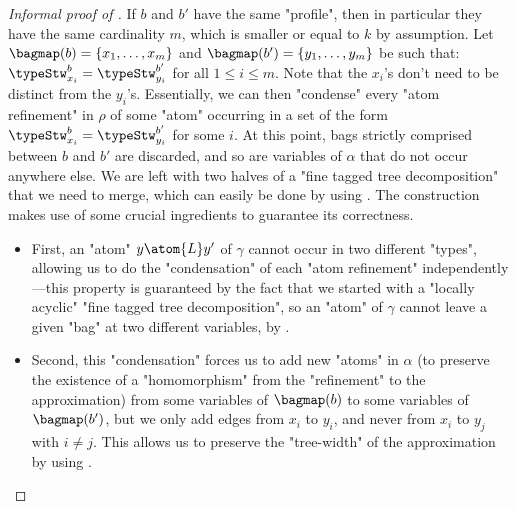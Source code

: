 \begin{proof}[Informal proof of ]
    \AP\label{proof-claim:shortening-paths}
    If $b$ and $b'$ have the same "profile", then in particular they have the same cardinality $m$,
    which is smaller or equal to $k$ by assumption.
    Let $\bagmap(b) = \{x_1,\hdots, x_m\}$ and $\bagmap(b') = \{y_1,\hdots,y_m\}$ be such that: 
    $\typeStw^{b}_{x_i} = \typeStw^{b'}_{y_i}$ for all $1 \leq i \leq m$.
	Note that the $x_i$'s don't need to be distinct from the $y_i$'s.
	Essentially, we can then "condense"
    every "atom refinement" in $\rho$ of some "atom" occurring in a set
    of the form $\typeStw^{b}_{x_i} = \typeStw^{b'}_{y_i}$ for some $i$.
	At this point, bags strictly comprised between
    $b$ and $b'$ are discarded, and so are variables of $\alpha$ that do not occur anywhere else.
    We are left with two halves of a "fine tagged tree decomposition" that we need to merge,
    which can easily be done by using .
    The construction makes use of some crucial ingredients to guarantee its correctness.
    \begin{itemize}
        \item First, an "atom" $y \atom{L} y'$ of $\gamma$ cannot occur
            in two different "types", allowing us to do the "condensation" of each "atom refinement" independently---this property is guaranteed by the fact that we started
			with a "locally acyclic" "fine tagged tree decomposition", so an "atom" of $\gamma$ cannot leave a given "bag" at two different variables, by
			.
        \item Second, this "condensation" forces us to add new "atoms" in $\alpha$ (to preserve the
            existence of a "homomorphism" from the "refinement" to the approximation)
            from some variables of $\bagmap(b)$ to some variables of $\bagmap(b')$,
            but we only add edges from $x_i$ to $y_i$, and never from $x_i$ to $y_j$ with
			$i \neq j$. This allows us to preserve the "tree-width" of the approximation
			by using .\qedhere
    \end{itemize}
\end{proof}

